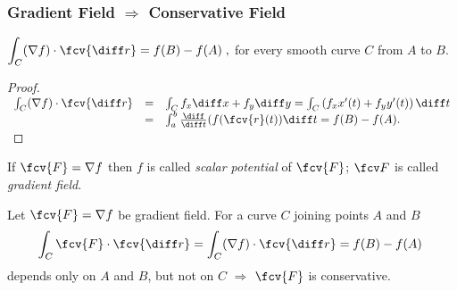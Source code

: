 \begin{frame}
\frametitle{Gradient Field $\Rightarrow$ Conservative Field }

\begin{theorem}
$\displaystyle
\int_C (\nabla f) \cdot \fcv{\diff r} = f(B) - f(A) \; ,
$
for every smooth curve $C$ from $A$ to $B$.
\end{theorem}
\begin{proof}
$
\begin{array}{rcl}
\int_C (\nabla f) \cdot \fcv{\diff r} &=&\int_C f_x\diff x + f_y\diff y= \int_C \left( f_x x'(t) + f_y y'(t)\right)\diff t \\
&=&\int_a^b \frac{\diff }{\diff t} (f(\fcv{r}(t))  \diff t = f(B) - f(A).
\end{array}
$
\end{proof}

\begin{definition}
If $\fcv{F}= \nabla f$ then $f$ is called \emph{scalar potential} of $\fcv{F}$; $\fcv F$ is called \emph{gradient field}.
\end{definition}

Let $\fcv{F} = \nabla f$ be gradient field. For a curve $C$ joining points $A$ and $B$
\[
\int_C \fcv{F} \cdot \fcv{\diff r} =  \int_C (\nabla f )\cdot \fcv{\diff r}= f(B) - f(A)\;
\]
depends only on $A$ and $B$, but not on $C$ $\Rightarrow$ $\fcv{F}$ is conservative.
\end{frame}